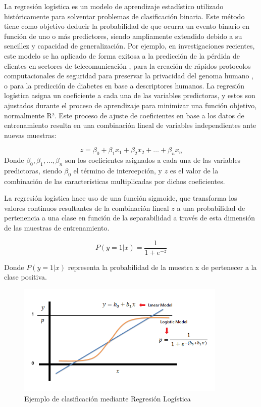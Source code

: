 La regresión logística es un modelo de aprendizaje estadístico utilizado históricamente para solventar problemas de clasificación binaria. Este método tiene como objetivo deducir la probabilidad de que ocurra un evento binario en función de uno o más predictores, siendo ampliamente extendido debido a su sencillez y capacidad de generalización. Por ejemplo, en investigaciones recientes, este modelo se ha aplicado de forma exitosa a la predicción de la pérdida de clientes en sectores de telecomunicación \cite{jain2020churn}, para la creación de rápidos protocolos computacionales de seguridad para preservar la privacidad del genoma humano \cite{de2021high}, o para la predicción de diabetes \cite{joshi2021predicting} en base a descriptores humanos. La regresión logística asigna un coeficiente a cada una de las variables predictoras, y estos son ajustados durante el proceso de aprendizaje para minimizar una función objetivo, normalmente R². Este proceso de ajuste de coeficientes en base a los datos de entrenamiento resulta en una combinación lineal de variables independientes ante nuevas muestras:

\[
z = \beta_0 + \beta_1 x_1 + \beta_2 x_2 + \dots + \beta_n x_n
\]
Donde $\beta_0, \beta_1, \dots, \beta_n$ son los coeficientes asignados a cada una de las variables predictoras, siendo $\beta_0$ el término de intercepción, y $z$ es el valor de la combinación de las características multiplicadas por dichos coeficientes.

La regresión logística hace uso de una función sigmoide, que transforma los valores continuos resultantes de la combinación lineal $z$ a una probabilidad de pertenencia a una clase en función de la separabilidad a través de esta dimensión de las muestras de entrenamiento.

\[
P(y = 1 | x) = \frac{1}{1 + e^{-z}}
\]

Donde $P(y = 1 | x)$ representa la probabilidad de la muestra x de pertenecer a la clase positiva.


\begin{figure}[h]
	\centering
	\includegraphics[width=10cm]{Figures/Background/LogReg_1.png}
	\caption{Ejemplo de clasificación mediante Regresión Logística \cite{LR}}
	\label{LR_BACKGROUND}
\end{figure}


